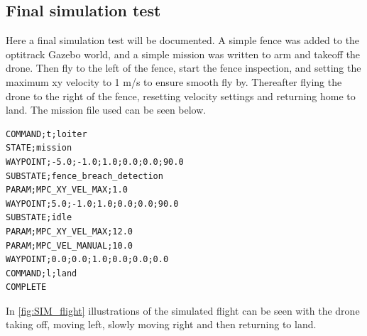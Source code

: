 \documentclass[../Head/Main.tex]{subfiles}
\begin{document}
\subsection{Final simulation test}
Here a final simulation test will be documented. A simple fence was added to the optitrack Gazebo world, and a simple mission was written to arm and takeoff the drone. Then fly to the left of the fence, start the fence inspection, and setting the maximum xy velocity to 1 m/s to ensure smooth fly by. Thereafter flying the drone to the right of the fence, resetting velocity settings and returning home to land. The mission file used can be seen below.

\begin{lstlisting}
COMMAND;t;loiter
STATE;mission
WAYPOINT;-5.0;-1.0;1.0;0.0;0.0;90.0
SUBSTATE;fence_breach_detection
PARAM;MPC_XY_VEL_MAX;1.0
WAYPOINT;5.0;-1.0;1.0;0.0;0.0;90.0
SUBSTATE;idle
PARAM;MPC_XY_VEL_MAX;12.0
PARAM;MPC_VEL_MANUAL;10.0
WAYPOINT;0.0;0.0;1.0;0.0;0.0;0.0
COMMAND;l;land
COMPLETE
\end{lstlisting}

In \autoref{fig:SIM_flight} illustrations of the simulated flight can be seen with the drone taking off, moving left, slowly moving right and then returning to land.

\newcommand{\figSize}{0.33\textwidth}
\end{document}
